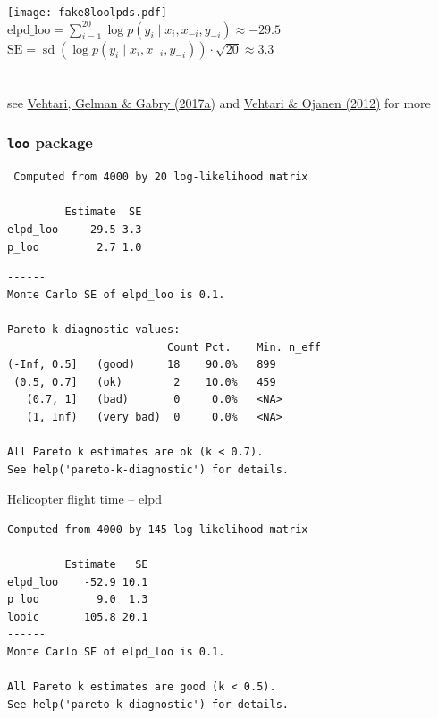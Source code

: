 \documentclass[english,t]{beamer}
\DeclareMathOperator{\sd}{sd}
\begin{document}
\begin{frame}{}

  {\texttt{[image: fake8loolpds.pdf]}}
  \\ \vspace{-0.5\baselineskip}
  {\color{blue} $\mbox{elpd\_loo} = \sum_{i=1}^{20} \log p(y_i \mid x_i,x_{-i},y_{-i}) \approx -29.5$\\ \vspace{0.2\baselineskip}}
  {\color{blue} $\mbox{SE} = \sd(\log p(y_i \mid x_i,x_{-i},y_{-i}))\cdot \sqrt{20} \approx 3.3$}
  {~\\~\\~\\ \color{black} \footnotesize see \href{http://link.springer.com/article/10.1007/s11222-016-9696-4}{Vehtari, Gelman \& Gabry (2017a)} and \href{http://dx.doi.org/10.1214/12-SS102}{Vehtari \& Ojanen (2012)} for more}
  
\end{frame}
\begin{frame}[fragile]
  \frametitle{{\tt loo} package}

  {\scriptsize
\begin{lstlisting}
 Computed from 4000 by 20 log-likelihood matrix

         Estimate  SE
elpd_loo    -29.5 3.3
p_loo         2.7 1.0
\end{lstlisting}
      {\color{gray}
\begin{lstlisting}
------
Monte Carlo SE of elpd_loo is 0.1.

Pareto k diagnostic values:
                         Count Pct.    Min. n_eff
(-Inf, 0.5]   (good)     18    90.0%   899       
 (0.5, 0.7]   (ok)        2    10.0%   459       
   (0.7, 1]   (bad)       0     0.0%   <NA>      
   (1, Inf)   (very bad)  0     0.0%   <NA>      

All Pareto k estimates are ok (k < 0.7).
See help('pareto-k-diagnostic') for details.
\end{lstlisting}}
}
\end{frame}

\begin{frame}[fragile]{Helicopter flight time -- elpd}

{\small
\begin{lstlisting}
Computed from 4000 by 145 log-likelihood matrix

         Estimate   SE
elpd_loo    -52.9 10.1
p_loo         9.0  1.3
looic       105.8 20.1
------
Monte Carlo SE of elpd_loo is 0.1.

All Pareto k estimates are good (k < 0.5).
See help('pareto-k-diagnostic') for details.
\end{lstlisting}}

\end{frame}
\end{document}
